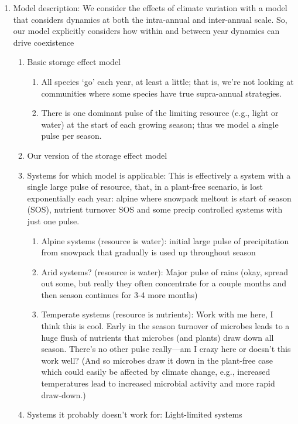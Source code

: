 \documentclass[11pt,letterpaper]{article}
\begin{document}
\begin{enumerate}
\begin{enumerate}
\end{enumerate}
\item Model description: We consider the effects of climate variation with a model that considers dynamics at both the
intra-annual and inter-annual scale. So, our model explicitly considers how within and between year dynamics can drive coexistence
\begin{enumerate}
\item Basic storage effect model
\begin{enumerate}
\item All species `go' each year, at least a little; that is, we're
  not looking at communities where some species have true
  supra-annual strategies.
\item There is one dominant pulse of the limiting resource (e.g.,
  light or water) at the
  start of each growing season; thus we model a  single pulse per
  season.
\end{enumerate}
\item Our version of the storage effect model
\item Systems for which model is applicable: This is effectively a system with a single large pulse of resource, that, in a plant-free scenario, is lost exponentially each year: alpine where snowpack meltout is start of season (SOS), nutrient turnover SOS and some precip controlled systems with just one pulse. 
\begin{enumerate}
\item Alpine systems (resource is water): initial large pulse of precipitation from
  snowpack that gradually is used up  throughout season
\item Arid systems? (resource is water): Major pulse of rains (okay, spread out some,
  but really they often concentrate for a couple months and then
  season continues for 3-4 more months)
\item Temperate systems (resource is nutrients): Work with me here, I
  think this is cool. Early in the season turnover of microbes leads
  to a huge flush of nutrients \citep{Zak:1990ar} that microbes (and plants) draw down
  all season. There's no other pulse really---am I crazy here or
  doesn't this work well? (And so microbes draw it down in the
  plant-free case which could easily be affected by climate change,
  e.g., increased temperatures lead to increased microbial activity
  and more rapid draw-down.)
\end{enumerate}
\item Systems it probably doesn't work for: Light-limited systems

\end{enumerate}
\end{enumerate}
\end{document}

